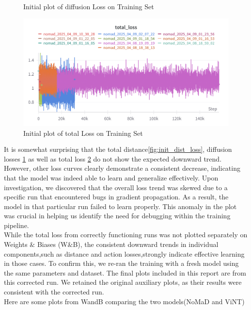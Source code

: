 \documentclass[12pt]{article}
\begin{document}
\begin{appendices}
\begin{figure}[H]
    \caption{Initial plot of diffusion Loss on Training Set}
    \label{fig:init_diff_loss}
\end{figure}
\begin{figure}[H]
    \centering
    \includegraphics[width=\textwidth]{images/totalloss_nomad.png}
    \caption{Initial plot of total Loss on Training Set}
    \label{fig:init_total_loss}
\end{figure}
It is somewhat surprising that the total distance\ref{fig:init_dist_loss}, diffusion losses \ref{fig:init_diff_loss} as well as total loss \ref{fig:init_total_loss} do not show the expected downward trend. However, other loss curves clearly demonstrate a consistent decrease, indicating that the model was indeed able to learn and generalize effectively.
Upon investigation, we discovered that the overall loss trend was skewed due to a specific run that encountered bugs in gradient propagation. As a result, the model in that particular run failed to learn properly. This anomaly in the plot was crucial in helping us identify the need for debugging within the training pipeline.\\
While the total loss from correctly functioning runs was not plotted separately on Weights $\&$ Biases (W$\&$B), the consistent downward trends in individual components,such as distance and action losses,strongly indicate effective learning in those cases. To confirm this, we re-ran the training with a fresh model using the same parameters and dataset. The final plots included in this report are from this corrected run. We retained the original auxiliary plots, as their results were consistent with the corrected run.\\


Here are some plots from WandB comparing the two models(NoMaD and ViNT)\\

\end{appendices}
\end{document}
